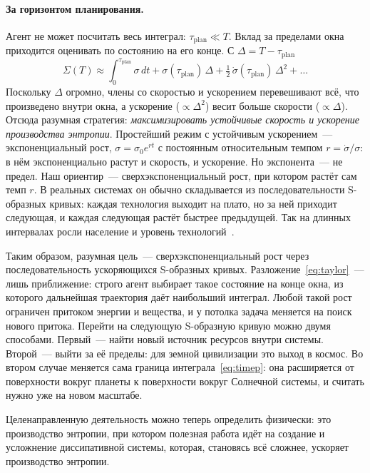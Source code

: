 \documentclass[11pt,a4paper]{article}
\begin{document}
\paragraph{За горизонтом планирования.}
Агент не может посчитать весь интеграл: $\tau_{\mathrm{plan}}\ll T$. Вклад за пределами окна приходится оценивать по состоянию на его конце. С $\Delta=T-\tau_{\mathrm{plan}}$
\begin{equation}\label{eq:taylor}
\Sigma(T)\approx\int_0^{\tau_{\mathrm{plan}}}\!\sigma\,dt+\sigma(\tau_{\mathrm{plan}})\,\Delta+\tfrac12\,\dot\sigma(\tau_{\mathrm{plan}})\,\Delta^2+\dots
\end{equation}
Поскольку $\Delta$ огромно, члены со скоростью и ускорением перевешивают всё, что произведено внутри окна, а ускорение ($\propto\Delta^2$) весит больше скорости ($\propto\Delta$). Отсюда разумная стратегия: \emph{максимизировать устойчивые скорость и ускорение производства энтропии}. Простейший режим с устойчивым ускорением~--- экспоненциальный рост, $\sigma=\sigma_0e^{rt}$ с постоянным относительным темпом $r=\dot\sigma/\sigma$: в нём экспоненциально растут и скорость, и ускорение. Но экспонента~--- не предел. Наш ориентир~--- сверхэкспоненциальный рост, при котором растёт сам темп $r$. В реальных системах он обычно складывается из последовательности S-образных кривых: каждая технология выходит на плато, но за ней приходит следующая, и каждая следующая растёт быстрее предыдущей. Так на длинных интервалах росли население и уровень технологий~\cite{foerster1960,kremer1993}.

Таким образом, разумная цель~--- сверхэкспоненциальный рост через последовательность ускоряющихся S-образных кривых. Разложение~\eqref{eq:taylor}~--- лишь приближение: строго агент выбирает такое состояние на конце окна, из которого дальнейшая траектория даёт наибольший интеграл. Любой такой рост ограничен притоком энергии и вещества, и у потолка задача меняется на поиск нового притока. Перейти на следующую S-образную кривую можно двумя способами. Первый~--- найти новый источник ресурсов внутри системы. Второй~--- выйти за её пределы: для земной цивилизации это выход в космос. Во втором случае меняется сама граница интеграла~\eqref{eq:timep}: она расширяется от поверхности вокруг планеты к поверхности вокруг Солнечной системы, и считать нужно уже на новом масштабе.

Целенаправленную деятельность можно теперь определить физически: это производство энтропии, при котором полезная работа идёт на создание и усложнение диссипативной системы, которая, становясь всё сложнее, ускоряет производство энтропии.
\end{document}
